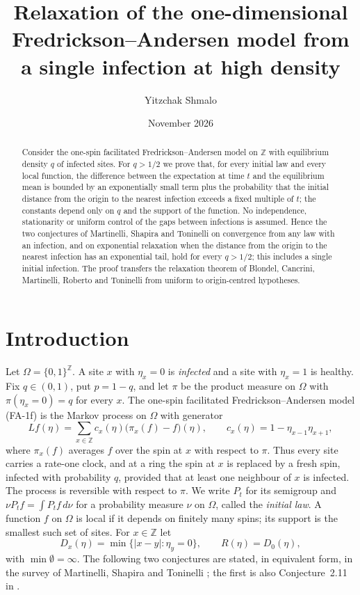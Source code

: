 \documentclass[11pt]{amsart}
\title[FA-1f out of equilibrium at high density]{Relaxation of the one-dimensional Fredrickson--Andersen model from
a single infection at high density}
\author{Yitzchak Shmalo}
\date{November 2026}
\theoremstyle{remark}
\newcommand{\Z}{\mathbb{Z}}
\begin{document}
\begin{abstract}
Consider the one-spin facilitated Fredrickson--Andersen model on $\Z$ with equilibrium density $q$ of infected
sites. For $q>1/2$ we prove that, for every initial law and every local function, the difference between the expectation
at time $t$ and the equilibrium mean is bounded by an exponentially small term plus the probability that the
initial distance from the origin to the nearest infection exceeds a fixed multiple of $t$; the constants depend
only on $q$ and the support of the function. No independence, stationarity
or uniform control of the gaps between infections is assumed. Hence the two conjectures of Martinelli, Shapira and
Toninelli on convergence from any law with an infection, and on exponential relaxation when the distance from the
origin to the nearest infection has an exponential tail, hold for every $q>1/2$; this includes a single initial
infection. The proof transfers the relaxation theorem of Blondel, Cancrini, Martinelli, Roberto and Toninelli from
uniform to origin-centred hypotheses.
\end{abstract}
\maketitle

\section{Introduction}\label{sec:intro}

Let $\Omega=\{0,1\}^{\Z}$. A site $x$ with $\eta_x=0$ is \emph{infected} and a site with $\eta_x=1$ is healthy. Fix
$q\in(0,1)$, put $p=1-q$, and let $\pi$ be the product measure on $\Omega$ with $\pi(\eta_x=0)=q$ for every $x$. The
one-spin facilitated Fredrickson--Andersen model (FA-1f) \cite{FA84} is the Markov process on $\Omega$ with generator
\begin{equation}\label{eq:generator}
Lf(\eta)=\sum_{x\in\Z}c_x(\eta)\bigl(\pi_x(f)-f\bigr)(\eta),\qquad c_x(\eta)=1-\eta_{x-1}\eta_{x+1},
\end{equation}
where $\pi_x(f)$ averages $f$ over the spin at $x$ with respect to $\pi$. Thus every site carries a rate-one clock,
and at a ring the spin at $x$ is replaced by a fresh spin, infected with probability $q$, provided that at least one
neighbour of $x$ is infected. The process is reversible with respect to $\pi$. We write $P_t$ for its semigroup and
$\nu P_t f=\int P_tf\,d\nu$ for a probability measure $\nu$ on $\Omega$, called the \emph{initial law}. A function
$f$ on $\Omega$ is local if it depends on finitely many spins; its support is the smallest such set of sites. For
$x\in\Z$ let
\begin{equation}\label{eq:dist}
D_x(\eta)=\min\{|x-y|:\eta_y=0\},\qquad R(\eta)=D_0(\eta),
\end{equation}
with $\min\emptyset=\infty$. The following two conjectures are stated, in equivalent form, in the survey of Martinelli, Shapira and
Toninelli \cite[Section~1.1, Conjectures~1 and~2]{MST25}; the first is also Conjecture~2.11 in \cite{Mar26}.
\end{document}
